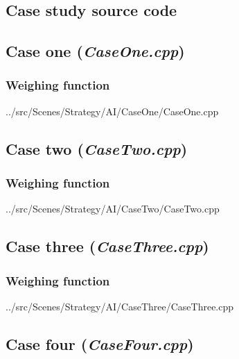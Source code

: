 \documentclass[11pt, a4paper]{report}
\begin{document}
\begin{appendices}
\chapter{Case study source code}
\label{appendix:caseStudySourceCode}

\section[Case one]{Case one (\emph{CaseOne.cpp})}
\label{sec:caseOneSourceCode}

\subsection{Weighing function}
\label{subsec:caseOneWeighingFunction}

\linespread{0.8}

{../src/Scenes/Strategy/AI/CaseOne/CaseOne.cpp}
\linespread{1.5}
\pagebreak

\section[Case two]{Case two (\emph{CaseTwo.cpp})}
\label{sec:caseTwoSourceCode}

\subsection{Weighing function}
\label{subsec:caseTwoWeighingFunction}

\linespread{0.8}

{../src/Scenes/Strategy/AI/CaseTwo/CaseTwo.cpp}
\linespread{1.5}
\pagebreak

\section[Case three]{Case three (\emph{CaseThree.cpp})}
\label{sec:caseThreeSourceCode}

\subsection{Weighing function}
\label{subsec:caseThreeWeighingFunction}

\linespread{0.8}

{../src/Scenes/Strategy/AI/CaseThree/CaseThree.cpp}
\linespread{1.5}
\pagebreak

\section[Case four]{Case four (\emph{CaseFour.cpp})}
\label{sec:caseFourSourceCode}


\end{appendices}
\end{document}
